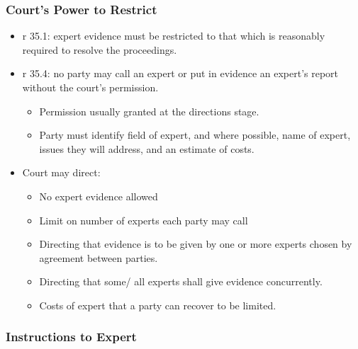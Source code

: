 \documentclass[
]{article}
\providecommand{\tightlist}{%
  \setlength{\itemsep}{0pt}\setlength{\parskip}{0pt}}
\begin{document}
\hypertarget{courts-power-to-restrict}{%
\subsubsection{Court's Power to
Restrict}\label{courts-power-to-restrict}}

\begin{itemize}
\tightlist
\item
  r 35.1: expert evidence must be restricted to that which is reasonably
  required to resolve the proceedings.
\item
  r 35.4: no party may call an expert or put in evidence an expert's
  report without the court's permission.

  \begin{itemize}
  \tightlist
  \item
    Permission usually granted at the directions stage.
  \item
    Party must identify field of expert, and where possible, name of
    expert, issues they will address, and an estimate of costs.
  \end{itemize}
\item
  Court may direct:

  \begin{itemize}
  \tightlist
  \item
    No expert evidence allowed
  \item
    Limit on number of experts each party may call
  \item
    Directing that evidence is to be given by one or more experts chosen
    by agreement between parties.
  \item
    Directing that some/ all experts shall give evidence concurrently.
  \item
    Costs of expert that a party can recover to be limited.
  \end{itemize}
\end{itemize}

\hypertarget{instructions-to-expert}{%
\subsubsection{Instructions to Expert}\label{instructions-to-expert}}
\end{document}
